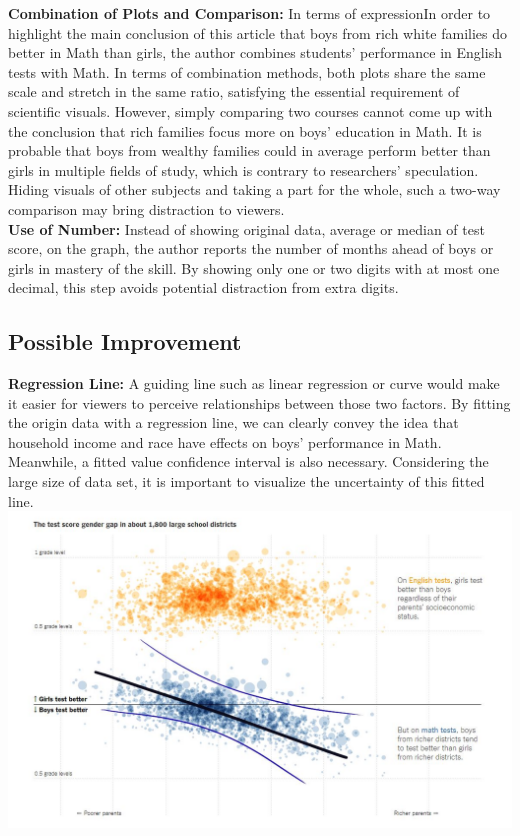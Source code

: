 \documentclass[11pt,letterpaper]{article}
\begin{document}
\noindent \textbf{Combination of Plots and Comparison:} In terms of expressionIn order to highlight the main conclusion of this article that boys from rich white families do better in Math than girls, the author combines students’ performance in English tests with Math. In terms of combination methods, both plots share the same scale and stretch in the same ratio, satisfying the essential requirement of scientific visuals. However, simply comparing two courses cannot come up with the conclusion that rich families focus more on boys’ education in Math. It is probable that boys from wealthy families could in average perform better than girls in multiple fields of study, which is contrary to researchers’ speculation. Hiding visuals of other subjects and taking a part for the whole, such a two-way comparison may bring distraction to viewers. \\

\noindent \textbf{Use of Number:} Instead of showing original data, average or median of test score, on the graph, the author reports the number of months ahead of boys or girls in mastery of the skill. By showing only one or two digits with at most one decimal, this step avoids potential distraction from extra digits. \\

\subsection*{Possible Improvement}
\textbf{Regression Line:} A guiding line such as linear regression or curve would make it easier for viewers to perceive relationships between those two factors. By fitting the origin data with a regression line, we can clearly convey the idea that household income and race have effects on boys' performance in Math. Meanwhile, a fitted value confidence interval is also necessary. Considering the large size of data set, it is important to visualize the uncertainty of this fitted line. \\

\includegraphics[scale=0.4]{improve-1.jpeg}
\end{document}
